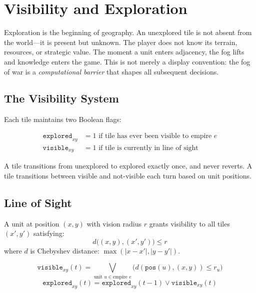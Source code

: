 \documentclass[11pt,a4paper,openany]{book}
\theoremstyle{plain}
\theoremstyle{definition}
\theoremstyle{remark}
\newenvironment{background}{%
  \begin{mdframed}[
    linecolor=sphereblue!40, backgroundcolor=sphereblue!5,
    linewidth=1pt, innertopmargin=8pt, innerbottommargin=8pt,
    innerleftmargin=10pt, innerrightmargin=10pt,
    skipabove=10pt, skipbelow=6pt
  ]%
  \setlength{\parindent}{0pt}%
  \noindent{\textcolor{sphereblue}{\textbf{Background}}}\par\smallskip\ignorespaces
}{\end{mdframed}}
\newenvironment{defbox}[1]{%
  \begin{tcolorbox}[
    title={\textbf{Definition:} #1},
    colback=defbg,
    colframe=sphereamber!80,
    fonttitle=\bfseries,
    coltitle=sphereamber!60!black,
    sharp corners,
    breakable,
    before upper={\normalfont\setlength{\parindent}{0pt}\tolerance=9999\hbadness=9999}
  ]
}{\end{tcolorbox}}
\newenvironment{mechanic}[1]{%
  \begin{tcolorbox}[
    title={\textbf{World Mechanic:} #1},
    colback=sphereteal!5,
    colframe=sphereteal,
    fonttitle=\bfseries\color{white},
    coltitle=white,
    sharp corners,
    breakable,
    before upper={\normalfont\setlength{\parindent}{0pt}\tolerance=9999\hbadness=9999}
  ]
}{\end{tcolorbox}}
\newcommand{\OR}{\ensuremath{\vee}}
\begin{document}
\chapter{Visibility and Exploration}
\label{ch:visibility}

\begin{background}
  Exploration is the beginning of geography. An unexplored tile is
  not absent from the world---it is present but unknown. The player
  does not know its terrain, resources, or strategic value. The moment
  a unit enters adjacency, the fog lifts and knowledge enters the game.
  This is not merely a display convention: the fog of war is a
  \emph{computational barrier} that shapes all subsequent decisions.
\end{background}

\section{The Visibility System}

Each tile maintains two Boolean flags:

\begin{align*}
  \texttt{explored}_{xy} &= 1 \text{ if tile has ever been visible to empire } e \\
  \texttt{visible}_{xy}  &= 1 \text{ if tile is currently in line of sight}
\end{align*}

A tile transitions from unexplored to explored exactly once, and never
reverts. A tile transitions between visible and not-visible each turn
based on unit positions.

\section{Line of Sight}

\begin{defbox}{Vision Range}
  A unit at position $(x, y)$ with vision radius $r$ grants visibility to
  all tiles $(x', y')$ satisfying:
  \[
    d\bigl((x,y),(x',y')\bigr) \leq r
  \]
  where $d$ is Chebyshev distance: $\max(|x-x'|, |y-y'|)$.
\end{defbox}

\begin{mechanic}{Fog of War Activation}
  \[
    \texttt{visible}_{xy}(t) = \bigvee_{\text{unit } u \in \text{empire } e}
    \bigl(d(\texttt{pos}(u), (x,y)) \leq r_u\bigr)
  \]
  \[
    \texttt{explored}_{xy}(t) = \texttt{explored}_{xy}(t-1) \OR
    \texttt{visible}_{xy}(t)
  \]
\end{mechanic}
\end{document}
